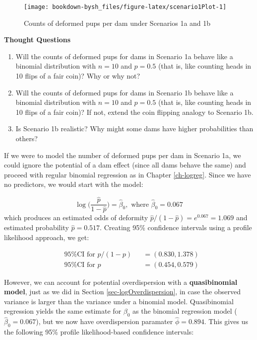 \documentclass[
]{krantz}
\begin{document}
\begin{figure}

{\centering \texttt{[image: bookdown-bysh\_files/figure-latex/scenario1Plot-1]} 

}

\caption{Counts of deformed pups per dam under Scenarios 1a and 1b}\label{fig:scenario1Plot}
\end{figure}

\textbf{Thought Questions}

\begin{enumerate}
\def\labelenumi{\arabic{enumi}.}
\item
  Will the counts of deformed pups for dams in Scenario 1a behave like a binomial distribution with \(n=10\) and \(p=0.5\) (that is, like counting heads in 10 flips of a fair coin)? Why or why not?
\item
  Will the counts of deformed pups for dams in Scenario 1b behave like a binomial distribution with \(n=10\) and \(p=0.5\) (that is, like counting heads in 10 flips of a fair coin)? If not, extend the coin flipping analogy to Scenario 1b.
\item
  Is Scenario 1b realistic? Why might some dams have higher probabilities than others?
\end{enumerate}

If we were to model the number of deformed pups per dam in Scenario 1a, we could ignore the potential of a dam effect (since all dams behave the same) and proceed with regular binomial regression as in Chapter \ref{ch-logreg}. Since we have no predictors, we would start with the model:

\begin{equation*}
  \log \bigg( \frac{\hat{p}}{1-\hat{p}} \bigg) = \hat{\beta}_0, \textrm{ where } \hat{\beta}_0 = 0.067
\end{equation*}
which produces an estimated odds of deformity \(\widehat{p}/(1-\widehat{p}) = e^{0.067} = 1.069\) and estimated probability \(\widehat{p} = 0.517\). Creating 95\% confidence intervals using a profile likelihood approach, we get:



\[
\begin{alignedat}{2}
  &\textrm{95\% CI for } p/(1-p) &&= (0.830, 1.378) \\
  &\textrm{95\% CI for } p       &&= (0.454, 0.579)
\end{alignedat}
\]

However, we can account for potential overdispersion with a \textbf{quasibinomial model}, just as we did in Section \ref{sec-logOverdispersion}, in case the observed variance is larger than the variance under a binomial model. Quasibinomial regression yields the same estimate for \(\beta_0\) as the binomial regression model (\(\hat{\beta}_0 = 0.067\)), but we now have overdispersion paramater \(\widehat{\phi} = 0.894\). This gives us the following 95\% profile likelihood-based confidence intervals:
\end{document}
